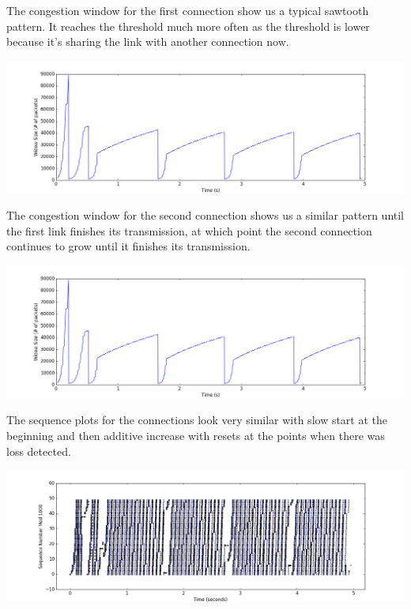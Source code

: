 \documentclass[11pt]{article}
\begin{document}
\vspace{5mm}

The congestion window for the first connection show us a typical sawtooth pattern. It reaches the threshold much more often as the threshold is lower because it's sharing the link with another connection now.

\vspace{5mm}

\includegraphics[width=17cm]{charts/two/windowSize1.png}

\vspace{5mm}

The congestion window for the second connection shows us a similar pattern until the first link finishes its transmission, at which point the second connection continues to grow until it finishes its transmission.

\vspace{5mm}

\includegraphics[width=17cm]{charts/two/windowSize1.png}

\vspace{5mm}

The sequence plots for the connections look very similar with slow start at the beginning and then additive increase with resets at the points when there was loss detected.

\vspace{5mm}

\includegraphics[width=17cm]{charts/two/sequence1.png}
\end{document}
